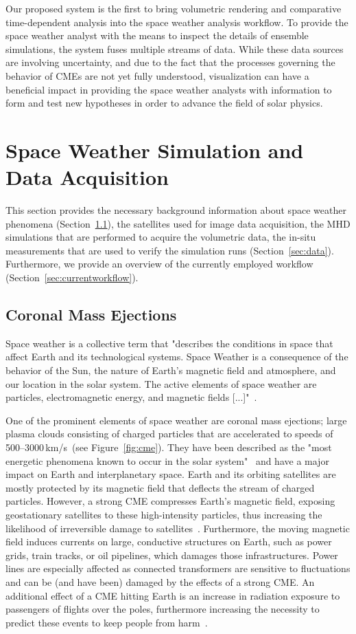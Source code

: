 \documentclass[journal]{vgtc}                %
\begin{document}
Our proposed system is the first to bring volumetric rendering and comparative time-dependent analysis into the space weather analysis workflow. To provide the space weather analyst with the means to inspect the details of ensemble simulations, the system fuses multiple streams of data. While these data sources are involving uncertainty, and due to the fact that the processes governing the behavior of CMEs are not yet fully understood, visualization can have a beneficial impact in providing the space weather analysts with information to form and test new hypotheses in order to advance the field of solar physics.  

\section{Space Weather Simulation and Data Acquisition}
This section provides the necessary background information about space weather phenomena (Section~\ref{sec:spaceweather}), the satellites used for image data acquisition, the MHD simulations that are performed to acquire the volumetric data, the in-situ measurements that are used to verify the simulation runs (Section~\ref{sec:data}). Furthermore, we provide an overview of the currently employed workflow (Section~\ref{sec:currentworkflow}).

\subsection{Coronal Mass Ejections} \label{sec:spaceweather}
Space weather is a collective term that "describes the conditions in space that affect Earth and its technological systems. Space Weather is a consequence of the behavior of the Sun, the nature of Earth’s magnetic field and atmosphere, and our location in the solar system. The active elements of space weather are particles, electromagnetic energy, and magnetic fields [...]"~\cite{noaaprofile}.

One of the prominent elements of space weather are coronal mass ejections; large plasma clouds consisting of charged particles that are accelerated to speeds of 500--3000\,km/s~(see Figure~\ref{fig:cme}). They have been described as the "most energetic phenomena known to occur in the solar system"~\cite{Kahler:1987jt} and have a major impact on Earth and interplanetary space. Earth and its orbiting satellites are mostly protected by its magnetic field that deflects the stream of charged particles. However, a strong CME compresses Earth's magnetic field, exposing geostationary satellites to these high-intensity particles, thus increasing the likelihood of irreversible damage to satellites~\cite{Guhathakurta:2013cl}. Furthermore, the moving magnetic field induces currents on large, conductive structures on Earth, such as power grids, train tracks, or oil pipelines, which damages those infrastructures. Power lines are especially affected as connected transformers are sensitive to fluctuations and can be (and have been) damaged by the effects of a strong CME. An additional effect of a CME hitting Earth is an increase in radiation exposure to passengers of flights over the poles, furthermore increasing the necessity to predict these events to keep people from harm~\cite{Matthia:2009en}.
\end{document}
